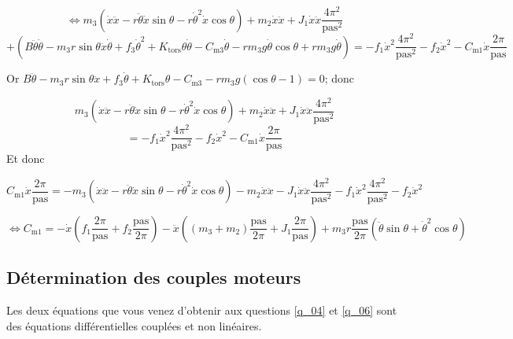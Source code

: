 \begin{corrige}
\begin{itemize}
$$
\Leftrightarrow m_3\left(
    \dot{x}\ddot{x} 
    - r\ddot{\theta}\dot{x}  \sin \theta
    - r\dot{\theta}^2\dot{x}  \cos \theta \right)
+ m_2 \dot{x}\ddot{x}
+ J_1 \dot{x}\ddot{x}\dfrac{4\pi^2}{\text{pas}^2}
$$
$$
       + \left(B\ddot{\theta} \dot{\theta}
       - m_3 r \sin \theta \ddot{x}   \dot{\theta}
        +f_3 \dot{\theta}^2
       +K_{\text{tors}}\theta \dot{\theta}
       - C_{\text{m3}}\dot{\theta}
       -rm_3 g   \dot{\theta} \cos \theta
       +rm_3 g \dot{\theta}\right)
=
  -f_1 \dot{x}^2\dfrac{4\pi^2}{\text{pas}^2} 
  - f_2 \dot{x}^2 -C_{\text{m1}} \dot{x}\dfrac{2\pi}{\text{pas}}
$$

Or $B\ddot{\theta} - m_3 r\sin\theta \ddot{x} + f_3 \dot{\theta} + K_{\text{tors}}\theta-  C_{\text{m3}} - rm_3g \left(\cos \theta - 1 \right) = 0   $; donc

$$ m_3\left(
    \dot{x}\ddot{x} 
    - r\ddot{\theta}\dot{x}  \sin \theta
    - r\dot{\theta}^2\dot{x}  \cos \theta \right)
+ m_2 \dot{x}\ddot{x}
+ J_1 \dot{x}\ddot{x}\dfrac{4\pi^2}{\text{pas}^2} 
$$
$$=
  -f_1 \dot{x}^2\dfrac{4\pi^2}{\text{pas}^2} 
  - f_2 \dot{x}^2 -C_{\text{m1}} \dot{x}\dfrac{2\pi}{\text{pas}}
$$
 Et donc 

$$ 
  C_{\text{m1}} \dot{x}\dfrac{2\pi}{\text{pas}}
  =
  -m_3\left(
    \dot{x}\ddot{x} 
    - r\ddot{\theta}\dot{x}  \sin \theta
    - r\dot{\theta}^2\dot{x}  \cos \theta \right)
- m_2 \dot{x}\ddot{x}
- J_1 \dot{x}\ddot{x}\dfrac{4\pi^2}{\text{pas}^2} 
 -f_1 \dot{x}^2\dfrac{4\pi^2}{\text{pas}^2} 
  -f_2 \dot{x}^2 
$$
 
 $$ 
 \Longleftrightarrow C_{\text{m1}} 
  =
   - \dot{x}\left( f_1\dfrac{2\pi}{\text{pas}} +f_2  \dfrac{\text{pas}}{2\pi}\right)
- \ddot{x}\left( \left( m_3+m_2 \right)\dfrac{\text{pas}}{2\pi}+ J_1 \dfrac{2\pi}{\text{pas}} \right)
  +m_3r\dfrac{\text{pas}}{2\pi}\left(
    \ddot{\theta}\sin \theta
    +\dot{\theta}^2  \cos \theta \right)
$$
\end{itemize}

\end{corrige}
\else
\fi

\subsection{Détermination des couples moteurs}


\ifprof
\else

Les deux équations que vous venez d’obtenir aux questions \ref{q_04} et \ref{q_06} sont des équations différentielles
couplées et non linéaires.

